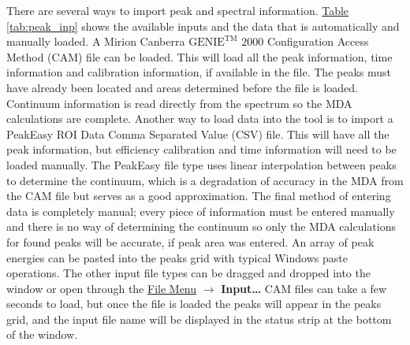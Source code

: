 \documentclass[12pt,report,justified]{SANDreport}
\begin{document}
There are several ways to import peak and spectral information.
\hyperref[tab:peak_inp]{Table \ref{tab:peak_inp}} shows the available inputs and
the data that is automatically and manually loaded. A Mirion Canberra \(\text{GENIE}^{\text{TM}}\) 2000
Configuration Access Method (CAM) file can be loaded. This will load all the peak information, time
information and calibration information, if available in the file. The peaks must have already been located
and areas determined before the file is loaded. Continuum information is read directly from the spectrum so
the MDA calculations are complete. Another way to load data into the tool is to import a PeakEasy ROI Data
Comma Separated Value (CSV) file. This will have all the peak information, but efficiency calibration and time
information will need to be loaded manually. The PeakEasy file type uses linear interpolation between peaks to
determine the continuum, which is a degradation of accuracy in the MDA from the CAM file but serves as a
good approximation. The final method of entering data is completely manual; every piece of information must be
entered manually and there is no way of determining the continuum so only the MDA calculations for found peaks
will be accurate, if peak area was entered. An array of peak energies can be pasted into the peaks grid with
typical Windows paste operations. The other input file types can be dragged and dropped into the window or open
through the \hyperref[sec:file_menu]{File Menu} \(\rightarrow\) \textbf{Input\ldots} CAM files can take a few seconds
to load, but once the file is loaded the peaks will appear in the peaks grid, and the input file name will be
displayed in the status strip at the bottom of the window.
\end{document}
